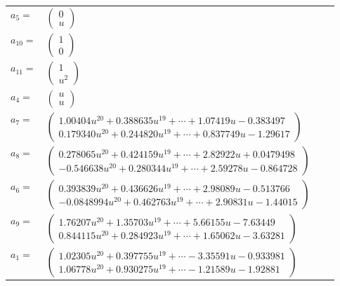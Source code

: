 \documentclass[1p]{elsarticle_modified}
\theoremstyle{definition}
\begin{document}
\begin{tabular}{m{7pt} m{180pt} m{7pt} m{180pt} }
\flushright $a_{5}=$&$\begin{pmatrix}0\\u\end{pmatrix}$ \\
\flushright $a_{10}=$&$\begin{pmatrix}1\\0\end{pmatrix}$ \\
\flushright $a_{11}=$&$\begin{pmatrix}1\\u^2\end{pmatrix}$ \\
\flushright $a_{4}=$&$\begin{pmatrix}u\\u\end{pmatrix}$ \\
\flushright $a_{7}=$&$\begin{pmatrix}1.00404 u^{20}+0.388635 u^{19}+\cdots+1.07419 u-0.383497\\0.179340 u^{20}+0.244820 u^{19}+\cdots+0.837749 u-1.29617\end{pmatrix}$ \\
\flushright $a_{8}=$&$\begin{pmatrix}0.278065 u^{20}+0.424159 u^{19}+\cdots+2.82922 u+0.0479498\\-0.546638 u^{20}+0.280344 u^{19}+\cdots+2.59278 u-0.864728\end{pmatrix}$ \\
\flushright $a_{6}=$&$\begin{pmatrix}0.393839 u^{20}+0.436626 u^{19}+\cdots+2.98089 u-0.513766\\-0.0848994 u^{20}+0.462763 u^{19}+\cdots+2.90831 u-1.44015\end{pmatrix}$ \\
\flushright $a_{9}=$&$\begin{pmatrix}1.76207 u^{20}+1.35703 u^{19}+\cdots+5.66155 u-7.63449\\0.844115 u^{20}+0.284923 u^{19}+\cdots+1.65062 u-3.63281\end{pmatrix}$ \\
\flushright $a_{1}=$&$\begin{pmatrix}1.02305 u^{20}+0.397755 u^{19}+\cdots-3.35591 u-0.933981\\1.06778 u^{20}+0.930275 u^{19}+\cdots-1.21589 u-1.92881\end{pmatrix}$ \\

\end{tabular}
\end{document}
